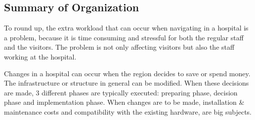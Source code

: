 \subsection{Summary of Organization}

To round up, the extra workload that can occur when navigating in a hospital is a problem, because it is time consuming and stressful for both the regular staff and the visitors. The problem is not only affecting visitors but also the staff working at the hospital. 

Changes in a hospital can occur when the region decides to save or spend money. The infrastructure or structure in general can be modified. When these decisions are made, 3 different phases are typically executed: preparing phase, decision phase and implementation phase. When changes are to be made, installation \& maintenance costs and compatibility with the existing hardware, are big subjects.


